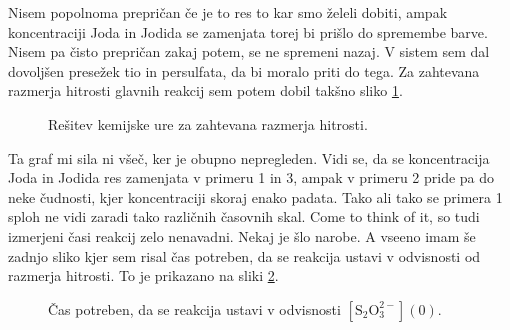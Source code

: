 \documentclass[a4paper]{article}
\begin{document}
Nisem popolnoma prepričan če je to res to kar smo želeli dobiti, ampak koncentraciji Joda in
Jodida se zamenjata torej bi prišlo do spremembe barve. Nisem pa čisto prepričan zakaj potem,
se ne spremeni nazaj. V sistem sem dal dovoljšen presežek tio in persulfata, da bi moralo
priti do tega. Za zahtevana razmerja hitrosti glavnih reakcij sem potem dobil takšno sliko 
\ref{fig:clock-req}.

\begin{figure}[H]
    \centering
    \caption{Rešitev kemijske ure za zahtevana razmerja hitrosti.}
    \label{fig:clock-req}
\end{figure}

Ta graf mi sila ni všeč, ker je obupno nepregleden. Vidi se, da se koncentracija Joda in Jodida
res zamenjata v primeru 1 in 3, ampak v primeru 2 pride pa do neke čudnosti, kjer koncentraciji 
skoraj enako padata. Tako ali tako se primera 1 sploh ne vidi zaradi tako različnih časovnih skal.
Come to think of it, so tudi izmerjeni časi reakcij zelo nenavadni. Nekaj je šlo narobe. A vseeno 
imam še zadnjo sliko kjer sem risal čas potreben, da se reakcija ustavi v odvisnosti od razmerja
hitrosti. To je prikazano na sliki \ref{fig:clock-speed}.

\begin{figure}[H]
    \centering
    \caption{Čas potreben, da se reakcija ustavi v odvisnosti $[\mathrm{S}_2\mathrm{O}_3^{2-}](0)$.}
    \label{fig:clock-speed}
\end{figure}
\end{document}
